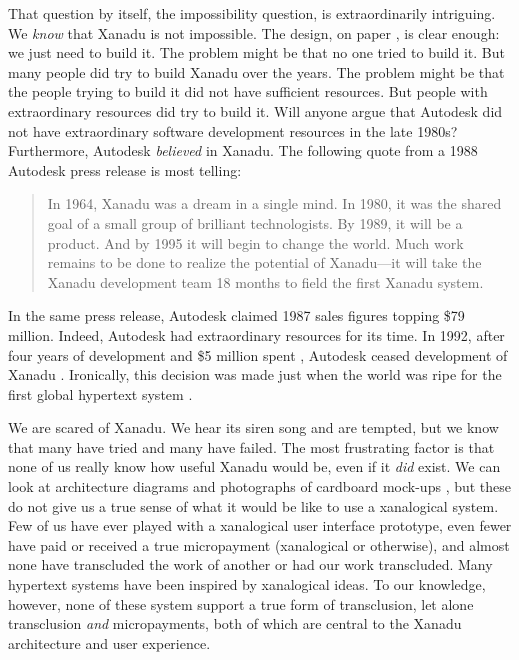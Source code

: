 \documentclass{acm_proc_article-sp}
\begin{document}
That question by itself, the impossibility question, is extraordinarily intriguing.  We \textit{know} that Xanadu is not impossible.  
The design, on paper \cite{NelsonLiteraryMachines}, is clear enough:  we just need to build it.  
The problem might be that no one tried to build it.  
But many people did try to build Xanadu over the years.  
The problem might be that the people trying to build it did not have sufficient resources.  But people with extraordinary resources did try to build it.  
Will anyone argue that Autodesk did not have extraordinary software development resources in the late 1980s?  
Furthermore, Autodesk \textit{believed} in Xanadu.  
The following quote from a 1988 Autodesk press release is most telling:

\begin{quote}
In 1964, Xanadu was a dream in a single mind.  In 1980, it was the
shared goal of a small group of brilliant technologists.  By 1989, it
will be a product.  And by 1995 it will begin to change the world.
Much work remains to be done to realize the potential of Xanadu---it
will take the Xanadu development team 18 months to field the first
Xanadu system. \cite{AutodeskPress} 
\end{quote}

In the same press release, Autodesk claimed 1987 sales figures topping \$79 million.  
Indeed, Autodesk had extraordinary resources for its time.  
In 1992, after four years of development and \$5 million spent \cite{AutodeskCost},  Autodesk ceased development of Xanadu \cite{AutodeskPressDrop}.  
Ironically, this decision was made just when the world was ripe for the first global hypertext system \cite{BernersLee92}.

We are scared of Xanadu.  
We hear its siren song and are tempted, but we know that many have tried and many have failed.  
The most frustrating factor is that none of us really know how useful Xanadu would be, even if it \textit{did} exist.  
We can look at architecture diagrams and photographs of cardboard mock-ups \cite{Nelson1999}, but these do not give us a true sense of what it would be like to use a xanalogical system.
Few of us have ever played with a xanalogical user interface prototype, even fewer have paid or received a true micropayment (xanalogical or otherwise), and almost none have transcluded the work of another or had our work transcluded.
Many hypertext systems have been inspired by xanalogical ideas.
To our knowledge, however, none of these system support a true form of transclusion, let alone transclusion \textit{and} micropayments, both of which are central to the Xanadu architecture and user experience.
\end{document}

